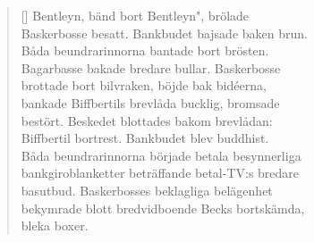 \begin{verse}[\versewidth]
Bentleyn, bänd bort Bentleyn", brölade\\
Baskerbosse besatt. Bankbudet bajsade baken brun.\\
Båda beundrarinnorna bantade bort brösten.\\
Bagarbasse bakade bredare bullar. Baskerbosse\\
brottade bort bilvraken, böjde bak bidéerna,\\
bankade Biffbertils brevlåda bucklig, bromsade\\
bestört. Beskedet blottades bakom brevlådan:\\
Biffbertil bortrest. Bankbudet blev buddhist.\\
Båda beundrarinnorna började betala besynnerliga\\
bankgiroblanketter beträffande betal-TV:s bredare\\
basutbud. Baskerbosses beklagliga belägenhet\\
bekymrade blott bredvidboende Becks bortskämda,\\
bleka boxer.\\




\end{verse}

